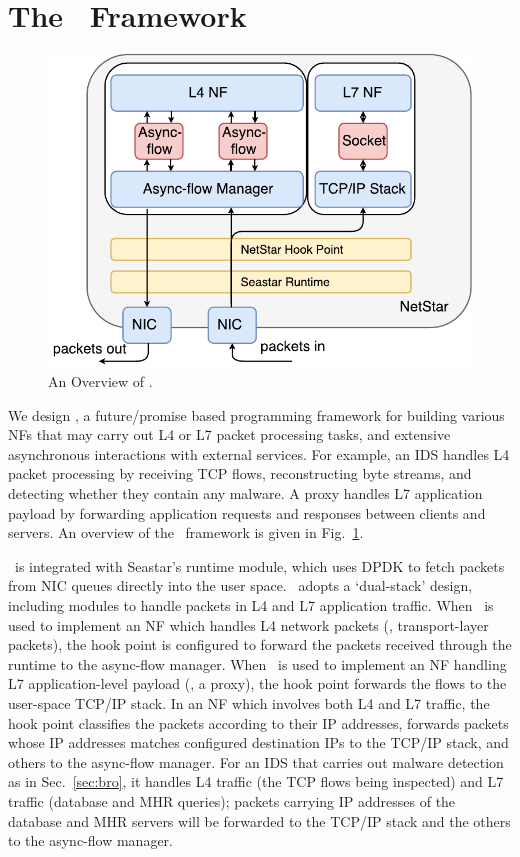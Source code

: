 \section{The \netstar~Framework}
\label{sec:netstar-overview}

\begin{figure}[!h]
  \centering
  \includegraphics[width=0.6\columnwidth]{chap-netstar/figure/netstar-overvew.pdf}
  \caption{An Overview of \netstar.}
  \label{fig:overview}
\end{figure}

We design \netstar, a future/promise based programming framework for building various NFs that may carry out L4 or L7 packet processing tasks, and extensive asynchronous interactions with external services. For example, an IDS handles L4 packet processing by receiving TCP flows, reconstructing byte streams, and detecting whether they contain any malware. A proxy handles L7 application payload by forwarding application requests and responses between clients and servers. An overview of the \netstar~framework is given in Fig.~\ref{fig:overview}.


\netstar~is integrated with Seastar's runtime module, which uses DPDK to fetch packets from NIC queues directly into the user space.
\netstar~adopts a `dual-stack' design, including modules to handle packets in L4 and L7 application traffic. When \netstar~is used to implement an NF which handles L4 network packets (\ie, transport-layer packets), the hook point is configured to forward the packets received through the runtime to the async-flow manager. When \netstar~is used to implement an NF handling L7 application-level payload (\eg, a proxy), the hook point forwards the flows to the user-space TCP/IP stack. In an NF which involves both L4 and L7 traffic, the hook point classifies the packets according to their IP addresses, forwards packets whose IP addresses matches configured destination IPs to the TCP/IP stack, and others to the async-flow manager. For an IDS that carries out malware detection as in Sec.~\ref{sec:bro}, it handles L4 traffic (the TCP flows being inspected) and L7 traffic (database and MHR queries); packets carrying IP addresses of the database and MHR servers will be forwarded to the TCP/IP stack and the others to the async-flow manager.


